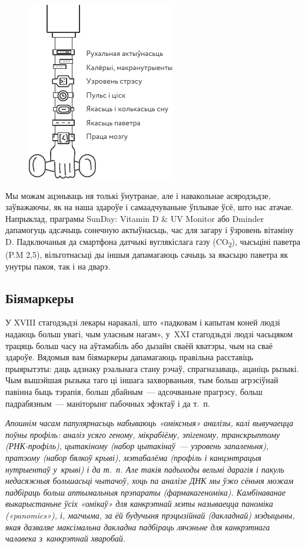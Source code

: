 \begin{figure}[htb!]
  \centering
  \includegraphics[scale=1.5]{willpower/ch3/4.pdf}
\end{figure}

Мы можам ацэньваць ня толькі ўнутранае, але і навакольнае асяродзьдзе, заўважаючы, як на наша здароўе і самаадчуваньне ўплывае ўсё, што нас атачае. Напрыклад, праграмы SunDay: Vitamin D \& UV Monitor або Dminder дапамогуць адсачыць сонечную актыўнасьць, час для загару і ўзровень вітаміну D. Падключаныя да смартфона датчыкі вуглякіслага газу (CO\textsubscript{2}), чысьціні паветра (P.M 2,5), вільготнасьці ды іншыя дапамагаюць сачыць за якасьцю паветра як унутры пакоя, так і на дварэ.

\subsection*{Біямаркеры}

У XVIII стагодзьдзі лекары наракалі, што «падковам і капытам коней людзі надаюць больш увагі, чым уласным нагам», у~XXI стагодзьдзі людзі часьцяком трацяць больш часу на аўтамабіль або дызайн сваёй кватэры, чым на сваё здароўе. Вядомыя вам біямаркеры дапамагаюць правільна расставіць прыярытэты: даць адзнаку рэальнага стану рэчаў, спрагназаваць, ацаніць рызыкі. Чым вышэйшая рызыка таго ці іншага захворваньня, тым больш агрэсіўнай павінна быць тэрапія, больш дбайным~--- адсочваньне прагрэсу, больш падрабязным~--- маніторынг пабочных эфэктаў і да т.~п.

\emph{Апошнім часам папулярнасьць набываюць «оміксныя» аналізы, калі вывучаецца поўны профіль: аналіз усяго геному, мікрабіёму, эпігеному, транскрыптому (РНК-профіль), цытакіному (набор цытакінаў~--- узровень запаленьня), пратэому (набор бялкоў крыві), мэтабалёма (профіль і канцэнтрацыя нутрыентаў у~крыві) і да т.~п. Але такія падыходы вельмі дарагія і пакуль недасяжныя большасьці чытачоў, хоць па аналізе ДНК мы ўжо сёньня можам падбіраць больш аптымальныя прэпараты (фармакагеноміка). Камбінаванае выкарыстаньне ўсіх «омікаў» для канкрэтнай мэты называецца паноміка («panomics»), і, магчыма, за ёй будучыня прэцызійнай (дакладнай) мэдыцыны, якая дазваляе максімальна дакладна падбіраць лячэньне для канкрэтнага чалавека з~канкрэтнай хваробай.}

